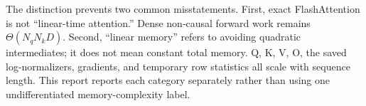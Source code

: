 The distinction prevents two common misstatements. First, exact FlashAttention is not ``linear-time attention.'' Dense non-causal forward work remains $\Theta(N_qN_kD)$. Second, ``linear memory'' refers to avoiding quadratic intermediates; it does not mean constant total memory. Q, K, V, O, the saved log-normalizers, gradients, and temporary row statistics all scale with sequence length. This report reports each category separately rather than using one undifferentiated memory-complexity label.
